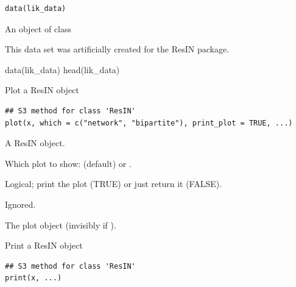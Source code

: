 \documentclass[a4paper]{book}
\begin{document}
%
\begin{Usage}
\begin{verbatim}
data(lik_data)
\end{verbatim}
\end{Usage}
%
\begin{Format}
An object of class 
\end{Format}
%
\begin{References}
This data set was artificially created for the ResIN package.
\end{References}
%
\begin{Examples}
\begin{ExampleCode}

data(lik_data)
head(lik_data)


\end{ExampleCode}
\end{Examples}
%
\begin{Description}
Plot a ResIN object
\end{Description}
%
\begin{Usage}
\begin{verbatim}
## S3 method for class 'ResIN'
plot(x, which = c("network", "bipartite"), print_plot = TRUE, ...)
\end{verbatim}
\end{Usage}
%
\begin{Arguments}
\begin{ldescription}
\item[\code{x}] A ResIN object.

\item[\code{which}] Which plot to show:  (default) or .

\item[\code{print\_plot}] Logical; print the plot (TRUE) or just return it (FALSE).

\item[\code{...}] Ignored.
\end{ldescription}
\end{Arguments}
%
\begin{Value}
The plot object (invisibly if ).
\end{Value}
%
\begin{Description}
Print a ResIN object
\end{Description}
%
\begin{Usage}
\begin{verbatim}
## S3 method for class 'ResIN'
print(x, ...)
\end{verbatim}
\end{Usage}
\end{document}
